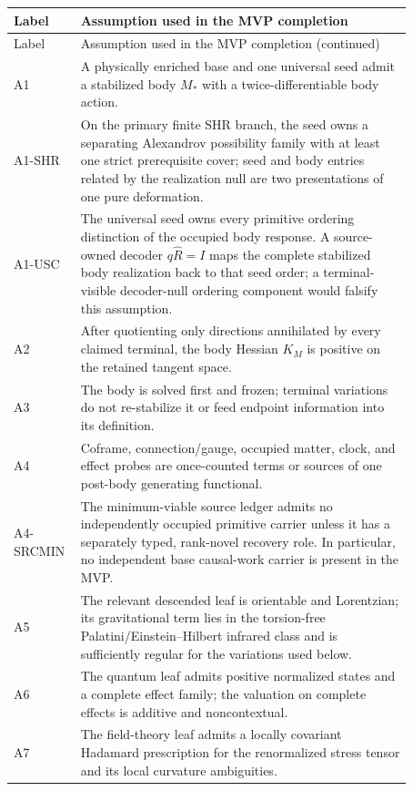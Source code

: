 \documentclass[11pt]{article}
\begin{document}
\small
\begin{longtable}{L{0.10\linewidth}L{0.77\linewidth}}
\toprule
Label & Assumption used in the MVP completion\\
\midrule
\endfirsthead
\toprule
Label & Assumption used in the MVP completion (continued)\\
\midrule
\endhead
A1 & A physically enriched base and one universal seed admit a stabilized
body \(M_*\) with a twice-differentiable body action.\\
A1-SHR & On the primary finite SHR branch, the seed owns a separating
Alexandrov possibility family with at least one strict prerequisite cover;
seed and body entries related by the realization null are two presentations
of one pure deformation.\\
A1-USC & The universal seed owns every primitive ordering distinction of the
occupied body response.  A source-owned decoder
\(q\widehat R=I\) maps the
complete stabilized body realization back to that seed order; a
terminal-visible decoder-null ordering component would falsify this assumption.\\
A2 & After quotienting only directions annihilated by every claimed terminal,
the body Hessian \(K_M\) is positive on the retained tangent space.\\
A3 & The body is solved first and frozen; terminal variations do not
re-stabilize it or feed endpoint information into its definition.\\
A4 & Coframe, connection/gauge, occupied matter, clock, and effect probes are
once-counted terms or sources of one post-body generating functional.\\
A4-SRCMIN & The minimum-viable source ledger admits no independently occupied
primitive carrier unless it has a separately typed, rank-novel recovery role.
In particular, no independent base causal-work carrier is present in the MVP.\\
A5 & The relevant descended leaf is orientable and Lorentzian; its
gravitational term lies in the torsion-free Palatini/Einstein--Hilbert
infrared class and is sufficiently regular for the variations used below.\\
A6 & The quantum leaf admits positive normalized states and a complete effect
family; the valuation on complete effects is additive and noncontextual.\\
A7 & The field-theory leaf admits a locally covariant Hadamard prescription for
the renormalized stress tensor and its local curvature ambiguities.\\

\end{longtable}
\end{document}

